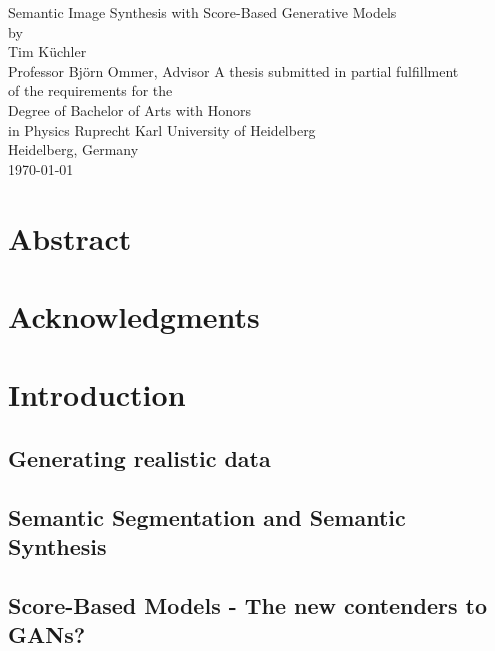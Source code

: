 \documentclass[a4paper, 12pt, oneside]{scrbook}
\begin{document}
\begin{titlepage}
\begin{center}
\vspace*{2cm}
{\huge Semantic Image Synthesis with Score-Based Generative Models} 
\vspace{2cm}\\
{\large by\\Tim Küchler}
\vspace{2cm}\\
{Professor Björn Ommer, Advisor}
\vfill
A thesis submitted in partial fulfillment\\
of the requirements for the\\
Degree of Bachelor of Arts with Honors\\
in Physics
\vspace*{3cm}
Ruprecht Karl University of Heidelberg\\
Heidelberg, Germany\\
\today %
\end{center}
\end{titlepage}
%
\frontmatter 
\chapter{Abstract}
\begin{center}

\end{center}

\chapter{Acknowledgments}

\tableofcontents

\mainmatter
\chapter{Introduction}
\section{Generating realistic data} %

\section{Semantic Segmentation and Semantic Synthesis} %
\section{Score-Based Models - The new contenders to GANs?} %
\end{document}
